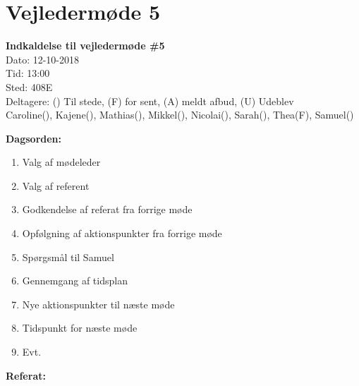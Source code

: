 \section{Vejledermøde 5}

\vspace{0.5 cm}
\textbf{Indkaldelse til vejledermøde \#5} \\

Dato: 12-10-2018 \\
Tid: 13:00 \\
Sted: 408E \\
Deltagere: () Til stede, (F) for sent, (A) meldt afbud, (U) Udeblev \\
Caroline(), Kajene(), Mathias(), Mikkel(), Nicolai(), Sarah(), Thea(F), Samuel() 

\vspace{0.1 cm}
\textbf{Dagsorden:}

\begin{enumerate}
	\item Valg af mødeleder
	\item Valg af referent
	\item Godkendelse af referat fra forrige møde
	\item Opfølgning af aktionspunkter fra forrige møde
	\item Spørgsmål til Samuel
	\item Gennemgang af tidsplan
	\item Nye aktionspunkter til næste møde
	\item Tidspunkt for næste møde
	\item Evt.
\end{enumerate}

\textbf{Referat:}

